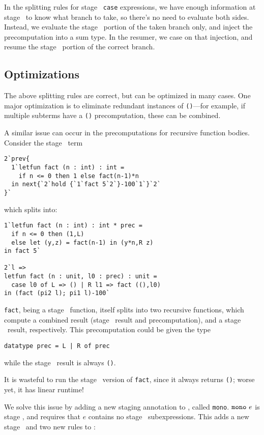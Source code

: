 In the splitting rules for stage \bbone\ {\tt case} expressions, we
have enough information at stage \bbone\ to know what branch to take, so there's
no need to evaluate both sides. Instead, we evaluate the stage \bbone\ portion of the
taken branch only, and inject the precomputation into a sum type. In the
resumer, we case on that injection, and resume the stage \bbtwo\ portion of the
correct branch.



\subsection{Optimizations}

The above splitting rules are correct, but can be optimized in many cases. One
major optimization is to eliminate redundant instances of \texttt{()}---for
example, if multiple subterms have a \texttt{()} precomputation, these can be
combined.

A similar issue can occur in the precomputations for recursive function bodies.
Consider the stage \bbtwo\ term
\begin{lstlisting}
2`prev{
  1`letfun fact (n : int) : int = 
    if n <= 0 then 1 else fact(n-1)*n
  in next{`2`hold {`1`fact 5`2`}-100`1`}`2`
}`
\end{lstlisting}
which splits into:
\begin{lstlisting}
1`letfun fact (n : int) : int * prec = 
  if n <= 0 then (1,L) 
  else let (y,z) = fact(n-1) in (y*n,R z)
in fact 5`

2`l => 
letfun fact (n : unit, l0 : prec) : unit = 
  case l0 of L => () | R l1 => fact ((),l0)
in (fact (pi2 l); pi1 l)-100`
\end{lstlisting}
\texttt{fact}, being a stage \bbone\ function, itself splits into two recursive
functions, which compute a combined result (stage \bbone\ result and
precomputation), and a stage \bbtwo\ result, respectively. This precomputation
could be given the type
\begin{lstlisting}
datatype prec = L | R of prec
\end{lstlisting}
while the stage \bbtwo\ result is always \texttt{()}.

It is wasteful to run the stage \bbtwo\ version of \texttt{fact}, since it
always returns \texttt{()}; worse yet, it has linear runtime!

We solve this issue by adding a new staging annotation to \lang, called
\texttt{mono}. ${\tt mono}~e$ is stage \bbone, and requires that $e$ contains
no stage \bbtwo\ subexpressions. This adds a new stage \bbmono\ and two new
rules to \lang:

